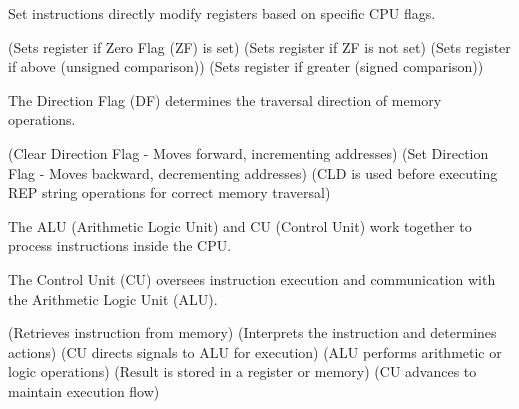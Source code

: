 \bigskip

\begin{NxSSSSBox}
	\begin{NxIDBox}
		Set instructions directly modify registers based on specific CPU flags.
		\begin{NxListDark}
			 (Sets register if Zero Flag (ZF) is set)
			 (Sets register if ZF is not set)
			 (Sets register if above (unsigned comparison))
			 (Sets register if greater (signed comparison))
		\end{NxListDark}
	\end{NxIDBox}
\end{NxSSSSBox}

\bigskip

\begin{NxSSSSBox}
	\begin{NxIDBox}
		The Direction Flag (DF) determines the traversal direction of memory operations.
		\begin{NxListDark}
			 (Clear Direction Flag - Moves forward, incrementing addresses)
			 (Set Direction Flag - Moves backward, decrementing addresses)
			 (CLD is used before executing REP string operations for correct memory traversal)
		\end{NxListDark}
	\end{NxIDBox}
\end{NxSSSSBox}

\begin{comment}
Memory Unit Example Size Typical Speed
Registers 16, 64-bit registers ~1 nanoseconds13
Cache Memory 4 - 8+ Megabytes14
(L1 and L2)
~5-60 nanoseconds
Primary Storage
 (i.e., main memory)
2 – 32+ Gigabytes15 ~100-150 nanoseconds
Secondary Storage
 (i.e., disk, SSD's, etc.)
500 Gigabytes –
 4+ Terabytes16
~3-15 milliseconds
\end{comment}

\begin{NxSSSSBox}[breakable]
	\begin{NxIDBox}
		The ALU (Arithmetic Logic Unit) and CU (Control Unit) work together to process instructions inside the CPU.
	\end{NxIDBox}
	\begin{NxIDBox}
		The Control Unit (CU) oversees instruction execution and communication with the Arithmetic Logic Unit (ALU).
		\begin{NxListDark}
			 (Retrieves instruction from memory)
			 (Interprets the instruction and determines actions)
			 (CU directs signals to ALU for execution)
			 (ALU performs arithmetic or logic operations)
			 (Result is stored in a register or memory)
			 (CU advances to maintain execution flow)
		\end{NxListDark}
	\end{NxIDBox}
\end{NxSSSSBox}

\begin{comment}
\begin{NxCodeBox}{asm}{dark, sdwA, frmE, title={
}}

\end{NxCodeBox}

\bigskip
\end{comment}

